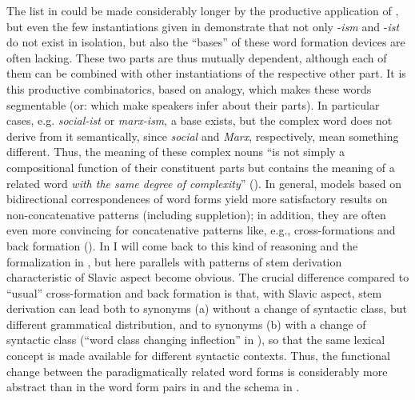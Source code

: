 \documentclass[output=paper]{langscibook}
\begin{document}
The list in  could be made considerably longer by the productive application of , but even the few instantiations given in  demonstrate that not only -\textit{ism} and -\textit{ist} do not exist in isolation, but also the “bases” of these word formation devices are often lacking. These two parts are thus mutually dependent, although each of them can be combined with other instantiations of the respective other part. It is this productive combinatorics, based on analogy, which makes these words segmentable (or: which make speakers infer about their parts). In particular cases, e.g. \textit{social-ist} or \textit{marx-ism}, a base exists, but the complex word does not derive from it semantically, since \textit{social} and \textit{Marx}, respectively, mean something different. Thus, the meaning of these complex nouns “is not simply a compositional function of their constituent parts but contains the meaning of a related word \emph{with the same degree of complexity}” (\citealt[33, emphasis added]{Booij2010}). In general, models based on bidirectional correspondences of word forms yield more satisfactory results on non-concatenative patterns (including suppletion); in addition, they are often even more convincing for concatenative patterns like, e.g., cross-formations and back formation (\citealt[47--51]{HaspelmathSims2010}). In  I will come back to this kind of reasoning and the formalization in , but here parallels with patterns of stem derivation characteristic of Slavic aspect become obvious. The crucial difference compared to “usual” cross-formation and back formation is that, with Slavic aspect, stem derivation can lead both to synonyms (a) without a change of syntactic class, but different grammatical distribution, and to synonyms (b) with a change of syntactic class (“word class changing inflection” in \citealt{Haspelmath1996}), so that the same lexical concept is made available for different syntactic contexts. Thus, the functional change between the paradigmatically related word forms is considerably more abstract than in the word form pairs in  and the schema in .
\end{document}

